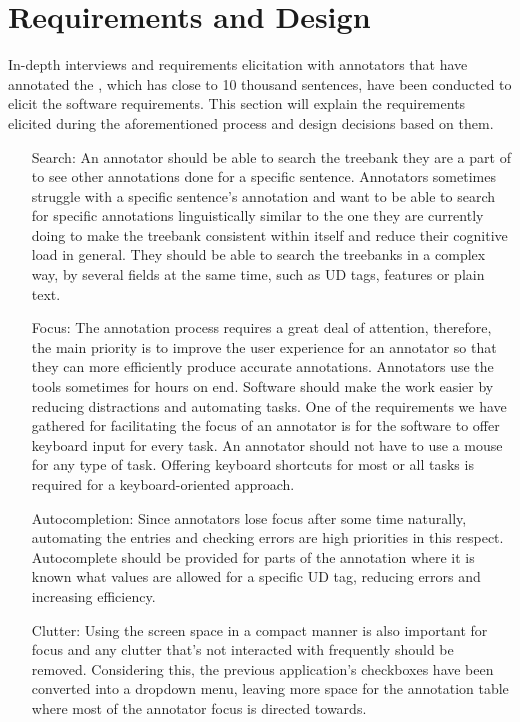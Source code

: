\section{Requirements and Design}
\label{sec:requirements}

In-depth interviews and requirements elicitation with annotators that have annotated the \bountreebank{}, which has close to 10 thousand sentences, have been conducted to elicit the software requirements.
This section will explain the requirements elicited during the aforementioned process and design decisions based on them.

\begin{itemize}[before=\normalfont, font=\itshape, align=left]
\item[Search:]
An annotator should be able to search the treebank they are a part of to see other annotations done for a specific sentence.
Annotators sometimes struggle with a specific sentence's annotation and want to be able to search for specific annotations linguistically similar to the one they are currently doing to make the treebank consistent within itself and reduce their cognitive load in general.
They should be able to search the treebanks in a complex way, by several fields at the same time, such as UD tags, features or plain text.

\item[Focus:]
The annotation process requires a great deal of attention, therefore, the main priority is to improve the user experience for an annotator so that they can more efficiently produce accurate annotations.
Annotators use the tools sometimes for hours on end.
Software should make the work easier by reducing distractions and automating tasks.
One of the requirements we have gathered for facilitating the focus of an annotator is for the software to offer keyboard input for every task.
An annotator should not have to use a mouse for any type of task.
Offering keyboard shortcuts for most or all tasks is required for a keyboard-oriented approach.

\item[Autocompletion:]
Since annotators lose focus after some time naturally, automating the entries and checking errors are high priorities in this respect.
Autocomplete should be provided for parts of the annotation where it is known what values are allowed for a specific UD tag, reducing errors and increasing efficiency.

\item[Clutter:]
Using the screen space in a compact manner is also important for focus and any clutter that's not interacted with frequently should be removed.
Considering this, the previous application's checkboxes have been converted into a dropdown menu, leaving more space for the annotation table where most of the annotator focus is directed towards.


\end{itemize}
